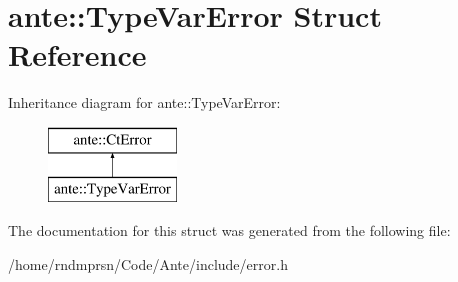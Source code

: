 \hypertarget{structante_1_1TypeVarError}{}\section{ante\+:\+:Type\+Var\+Error Struct Reference}
\label{structante_1_1TypeVarError}
Inheritance diagram for ante\+:\+:Type\+Var\+Error\+:\begin{figure}[H]
\begin{center}
\leavevmode
\includegraphics[height=2.000000cm]{structante_1_1TypeVarError}
\end{center}
\end{figure}


The documentation for this struct was generated from the following file\+:\begin{DoxyCompactItemize}
\item 
/home/rndmprsn/\+Code/\+Ante/include/error.\+h\end{DoxyCompactItemize}
